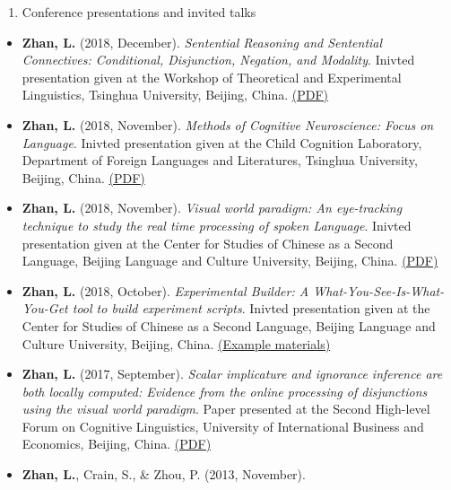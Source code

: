 \documentclass[10pt,]{article}
\providecommand{\tightlist}{%
  \setlength{\itemsep}{0pt}\setlength{\parskip}{0pt}}
\begin{document}
\begin{enumerate}
\def\labelenumi{\arabic{enumi}.}
\setcounter{enumi}{3}
\tightlist
\item
  Conference presentations and invited talks
\end{enumerate}

\begin{itemize}
\item
  \textbf{Zhan, L.} (2018, December). \emph{Sentential Reasoning and
  Sentential Connectives: Conditional, Disjunction, Negation, and
  Modality}. Inivted presentation given at the Workshop of Theoretical
  and Experimental Linguistics, Tsinghua University, Beijing, China.
  \href{https://publications.likan.info/Talks/Sentential_Reasoning_Sentential_Connectives.pdf}{
  (PDF) }
\item
  \textbf{Zhan, L.} (2018, November). \emph{Methods of Cognitive
  Neuroscience: Focus on Language}. Inivted presentation given at the
  Child Cognition Laboratory, Department of Foreign Languages and
  Literatures, Tsinghua University, Beijing, China.
  \href{https://publications.likan.info/Talks/MethodsCognNeurosciLang2018NOV.pdf}{
  (PDF) }
\item
  \textbf{Zhan, L.} (2018, November). \emph{Visual world paradigm: An
  eye-tracking technique to study the real time processing of spoken
  Language}. Inivted presentation given at the Center for Studies of
  Chinese as a Second Language, Beijing Language and Culture University,
  Beijing, China.
  \href{https://publications.likan.info/Talks/Visual_World_Paradigm.pdf}{
  (PDF) }
\item
  \textbf{Zhan, L.} (2018, October). \emph{Experimental Builder: A
  What-You-See-Is-What-You-Get tool to build experiment scripts}.
  Inivted presentation given at the Center for Studies of Chinese as a
  Second Language, Beijing Language and Culture University, Beijing,
  China.
  \href{https://publications.likan.info/Eyelink_Experiment_Builder_Training_Materials/}{
  (Example materials) }
\item
  \textbf{Zhan, L.} (2017, September). \emph{Scalar implicature and
  ignorance inference are both locally computed: Evidence from the
  online processing of disjunctions using the visual world paradigm}.
  Paper presented at the Second High-level Forum on Cognitive
  Linguistics, University of International Business and Economics,
  Beijing, China.
  \href{https://publications.likan.info/Talks/ZhanL2017UIBE.pdf}{ (PDF)
  }
\item
  \textbf{Zhan, L.}, Crain, S., \& Zhou, P. (2013, November).

\end{itemize}
\end{document}
